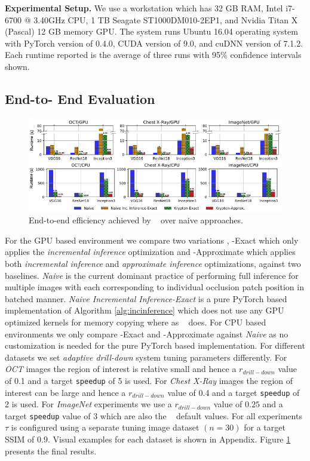 \vspace{2mm}
\noindent \textbf{Experimental Setup.}
We use a workstation which has 32 GB RAM, Intel i7-6700 @ 3.40GHz CPU, 1 TB Seagate ST1000DM010-2EP1, and Nvidia Titan X (Pascal) 12 GB memory GPU.
The system runs Ubuntu 16.04 operating system with PyTorch version of 0.4.0, CUDA version of 9.0, and cuDNN version of 7.1.2.
Each runtime reported is the average of three runs with 95\% confidence intervals shown.

\subsection{End-to- End Evaluation}

\begin{figure}[t]
\includegraphics[width=\textwidth]{images/5_1_all_edited_b}
\caption{End-to-end efficiency achieved by \system~ over naive approaches.}
\label{fig:5_1_all_edited}
\end{figure}

For the GPU based environment we compare two variations \system, \system-Exact which only applies the \textit{incremental inference} optimization and \system-Approximate which applies both \textit{incremental inference} and \textit{approximate inference} optimizations, against two baselines.
\textit{Naive} is the current dominant practice of performing full inference for multiple images with each corresponding to individual occlusion patch position in batched manner.
\textit{Naive Incremental Inference-Exact} is a pure PyTorch based implementation of Algorithm \ref{alg:incinference} which does not use any GPU optimized kernels for memory copying where as \system~ does.
For CPU based environments we only compare \system-Exact and \system-Approximate against \textit{Naive} as no customization is needed for the pure PyTorch based implementation.
For different datasets we set \textit{adaptive drill-down} system tuning parameters differently.
For \textit{OCT} images the region of interest is relative small and hence a $r_{drill-down}$ value of 0.1 and a target \texttt{speedup} of 5 is used.
For \textit{Chest X-Ray} images the region of interest can be large and hence a $r_{drill-down}$ value of 0.4 and a target \texttt{speedup} of 2 is used.
For \textit{ImageNet} experiments we use a $r_{drill-down}$ value of $0.25$ and a target \texttt{speedup} value of 3 which are also the \system~ default values.
For all experiments $\tau$ is configured using a separate tuning image dataset $(n=30)$ for a target SSIM of $0.9$.
Visual examples for each dataset is shown in Appendix.
Figure \ref{fig:5_1_all_edited} presents the final results.


